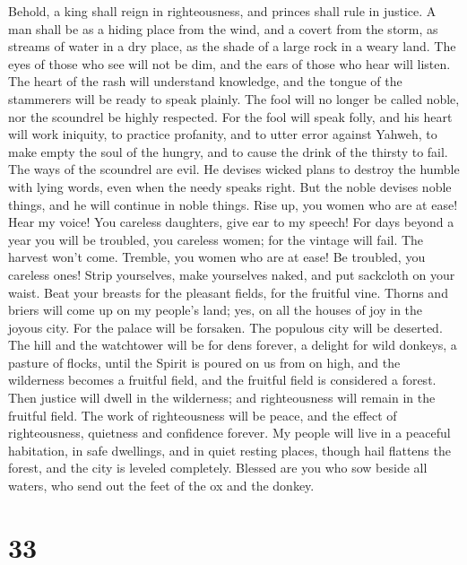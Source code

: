 Behold, a king shall reign in righteousness, and princes
shall rule in justice.  A man shall be as a hiding place
from the wind, and a covert from the storm, as streams of water in a dry
place, as the shade of a large rock in a weary land.  The
eyes of those who see will not be dim, and the ears of those who hear
will listen.  The heart of the rash will understand
knowledge, and the tongue of the stammerers will be ready to speak
plainly.  The fool will no longer be called noble, nor the
scoundrel be highly respected.  For the fool will speak
folly, and his heart will work iniquity, to practice profanity, and to
utter error against Yahweh, to make empty the soul of the hungry, and to
cause the drink of the thirsty to fail.  The ways of the
scoundrel are evil. He devises wicked plans to destroy the humble with
lying words, even when the needy speaks right.  But the
noble devises noble things, and he will continue in noble things.
 Rise up, you women who are at ease! Hear my voice! You
careless daughters, give ear to my speech!  For days beyond
a year you will be troubled, you careless women; for the vintage will
fail. The harvest won't come.  Tremble, you women who are
at ease! Be troubled, you careless ones! Strip yourselves, make
yourselves naked, and put sackcloth on your waist.  Beat
your breasts for the pleasant fields, for the fruitful vine.
 Thorns and briers will come up on my people's land; yes,
on all the houses of joy in the joyous city.  For the
palace will be forsaken. The populous city will be deserted. The hill
and the watchtower will be for dens forever, a delight for wild donkeys,
a pasture of flocks,  until the Spirit is poured on us from
on high, and the wilderness becomes a fruitful field, and the fruitful
field is considered a forest.  Then justice will dwell in
the wilderness; and righteousness will remain in the fruitful field.
 The work of righteousness will be peace, and the effect of
righteousness, quietness and confidence forever.  My people
will live in a peaceful habitation, in safe dwellings, and in quiet
resting places,  though hail flattens the forest, and the
city is leveled completely.  Blessed are you who sow beside
all waters, who send out the feet of the ox and the donkey.

\hypertarget{section-32}{%
\section{33}\label{section-32}}

